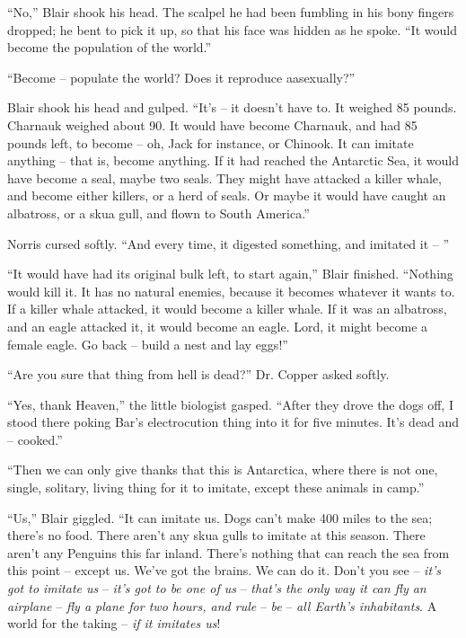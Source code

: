 \documentclass[letterpaper,openany,12pt]{memoir}		%
\begin{document}
``No,'' Blair shook his head. The scalpel he had been fumbling in his bony
fingers dropped; he bent to pick it up, so that his face was hidden as he spoke.
``It would become the population of the world.''

``Become -- populate the world? Does it reproduce aasexually?''

Blair shook his head and gulped. ``It's -- it doesn't have to. It weighed 85
pounds. Charnauk weighed about 90. It would have become Charnauk, and had 85
pounds left, to become -- oh, Jack for instance, or Chinook. It can imitate
anything -- that is, become anything. If it had reached the Antarctic Sea, it
would have become a seal, maybe two seals. They might have attacked a killer
whale, and become either killers, or a herd of seals. Or maybe it would have
caught an albatross, or a skua gull, and flown to South America.''

Norris cursed softly. ``And every time, it digested something, and imitated it
-- ''

``It would have had its original bulk left, to start again,'' Blair finished.
``Nothing would kill it. It has no natural enemies, because it becomes whatever
it wants to. If a killer whale attacked, it would become a killer whale. If it
was an albatross, and an eagle attacked it, it would become an eagle. Lord, it
might become a female eagle. Go back -- build a nest and lay eggs!''

``Are you sure that thing from hell is dead?'' Dr. Copper asked softly.

``Yes, thank Heaven,'' the little biologist gasped. ``After they drove the dogs
off, I stood there poking Bar's electrocution thing into it for five minutes.
It's dead and -- cooked.''

``Then we can only give thanks that this is Antarctica, where there is not one,
single, solitary, living thing for it to imitate, except these animals in
camp.''

``Us,'' Blair giggled. ``It can imitate us. Dogs can't make 400 miles to the
sea; there's no food. There aren't any skua gulls to imitate at this season.
There aren't any Penguins this far inland. There's nothing that can reach the
sea from this point -- except us. We've got the brains. We can do it. Don't you
see -- \emph{it's got to imitate us} -- \emph{it's got to be one of us} --
\emph{that's the only way it can fly an airplane} -- \emph{fly a plane for two
hours, and rule} -- \emph{be} -- \emph{all Earth's inhabitants}. A world for the
taking -- \emph{if it imitates us}!
\end{document}
